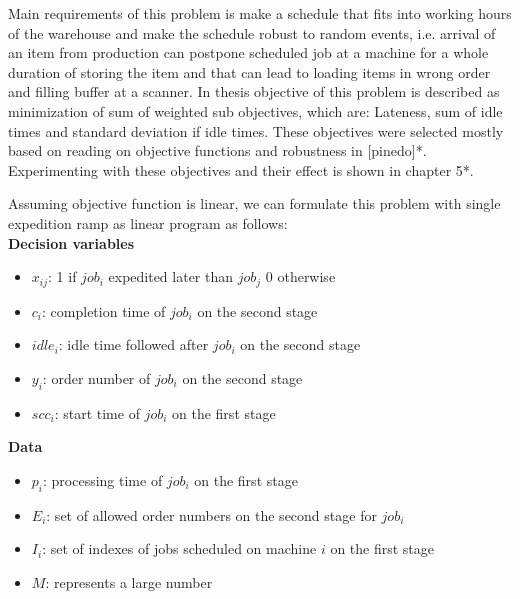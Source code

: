 \documentclass{ctuthesis}
\begin{document}
Main requirements of this problem is make a schedule that fits into working hours of the warehouse and make the schedule robust to random events, i.e. arrival of an item from production can postpone scheduled job at a machine for a whole duration of storing the item and that can lead to loading items in wrong order and filling buffer at a scanner. In thesis objective of this problem is described as minimization of sum of weighted sub objectives, which are: Lateness, sum of idle times and standard deviation if idle times. These objectives were selected mostly based on reading on objective functions and robustness in [pinedo]*. Experimenting with these objectives and their effect is shown in chapter 5*.

Assuming objective function is linear, we can formulate this problem with single expedition ramp as linear program as follows:
\\

\textbf{Decision variables}

\begin{itemize}
\item $x_{ij}$: 1 if $job_i$ expedited later than $job_j$ 0 otherwise
\item$c_i$: completion time of $job_i$ on the second stage
\item$idle_i$: idle time followed after $job_i$ on the second stage
\item$y_i$: order number of $job_i$ on the second stage
\item$scc_i$: start time of $job_i$ on the first stage 
\end{itemize}
\textbf{Data}
\begin{itemize}
\item$p_i$: processing time of $job_i$ on the first stage
\item$E_i$: set of allowed order numbers on the second stage for $job_i$
\item$I_i$: set of indexes of jobs scheduled on machine $i$ on the first stage
\item$M$: represents a large number
\end{itemize}
\end{document}
